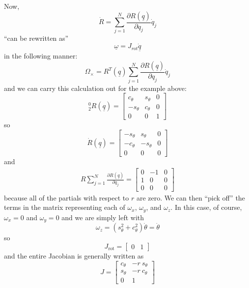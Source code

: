 \documentclass[]{article}
\begin{document}
Now,
\begin{displaymath}
\dot{R} = \sum_{j=1}^{N} \frac{\partial R(\underline{q})}{\partial q_{j}}\dot{q}_{j}
\end{displaymath}
``can be rewritten as''
\begin{displaymath}
	\underline{\omega}=J_{rot}\dot{\underline{q}}
\end{displaymath}
in the following manner:
\begin{displaymath}
	\Omega_{\times} = R^{T}(\underline{q})\sum_{j=1}^{N}\frac{\partial R(\underline{q})}{\partial q_{j}}\dot{q}_{j}
\end{displaymath}
and we can carry this calculation out for the example above:
\begin{displaymath}
	_{2}^{0}R(\underline{q}) = \left[\begin{array}{ccc} c_{\theta} & s_{\theta} & 0 \\ -s_{\theta} & c_{\theta} & 0 \\ 0 & 0 & 1 \end{array}\right]
\end{displaymath}
so
\begin{displaymath}
	\dot{R}(\underline{q}) = \left[\begin{array}{ccc} -s_{\theta} & s_{\theta} & 0 \\ -c_{\theta} & -s_{\theta} & 0 \\ 0 & 0 & 0 \end{array}\right]
\end{displaymath}
and
\begin{eqnarray}
R\sum_{j=1}^{N}\frac{\partial R(\underline{q})}{\partial q_{j}} = \left[ \begin{array}{ccc}  0 & -1 & 0 \\ 1 & 0 & 0 \\ 0 & 0 & 0 \end{array}\right]
\end{eqnarray}
because all of the partials with respect to $r$ are zero. We can then ``pick off'' the terms in the matrix representing each of $\omega_{x}$, $\omega_{y}$, and $\omega_{z}$. In this case, of course, $\omega_{x}=0$ and $\omega_{y}=0$ and we are simply left with
\begin{displaymath}
	\omega_{z} = (s_{\theta}^{2}+c_{\theta}^{2})\dot{\theta} = \dot{\theta}
\end{displaymath}
so
\begin{displaymath}
J_{\text{rot}} = \left[ \begin{array}{cc} 0 & 1 \end{array} \right]
\end{displaymath}
and the entire Jacobian is generally written as 
\begin{displaymath}
J = \left[ \begin{array}{cc} c_{\theta} & -r\ s_{\theta} \\ s_{\theta} & -r\ c_{\theta} \\ 0 & 1 \end{array} \right]
\end{displaymath}
\end{document}
